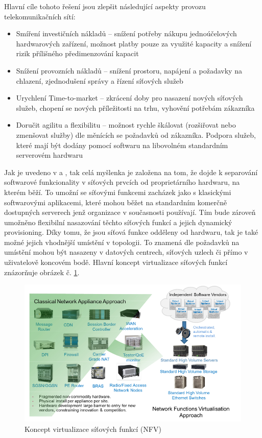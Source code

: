 Hlavní cíle tohoto řešení jsou zlepšit následující aspekty provozu telekomunikačních sítí:

\begin{itemize}
\item Smíření investičních nákladů – snížení potřeby nákupu jednoúčelových hardwarových zařízení, možnost platby pouze za využité kapacity a snížení rizik přílišného předimenzování kapacit
\item Snížení provozních nákladů – snížení prostoru, napájení a požadavky na chlazení, zjednodušení správy a řízení síťových služeb
\item Urychlení Time-to-market – zkrácení doby pro nasazení nových síťových služeb, chopení se nových příležitosti na trhu, vyhovění potřebám zákazníka
\item Doručit agilitu a flexibilitu – možnost rychle škálovat (rozšiřovat nebo zmenšovat služby) dle měnících se požadavků od zákazníka. Podpora služeb, které mají být dodány pomocí softwaru na libovolném standardním serverovém hardwaru
\end{itemize}

Jak je uvedeno v \cite{NFVState} a \cite{NFVChalanges}, tak celá myšlenka je založena na tom, že dojde k separování softwarové funkcionality v síťových prvcích od proprietárního hardwaru, na kterém běží. To umožní se síťovými funkcemi zacházek jako s klasickými softwarovými aplikacemi, které mohou běžet na standardním komerčně dostupných serverech jenž organizace v současnosti používají. Tím bude zároveň umožněno flexibilní nasazování těchto síťových funkcí a jejich dynamický provisioning. Díky tomu, že jsou síťová funkce odděleny od hardwaru, tak je také možné jejich vhodnější umístění v topologii. To znamená dle požadavků na umístění mohou být nasazeny v datových centrech, síťových uzlech či přímo v uživatelově koncovém bodě. Hlavní koncept virtualizace síťových funkcí znázorňuje obrázek č. \ref{fig:vize_NFV}. 

\begin{figure}[h]
\begin{centering}
\includegraphics[scale=0.5]{images/vize_NFV}
\par\end{centering}
\caption{Koncept virtualizace síťových funkcí (NFV)\label{fig:vize_NFV}}
\end{figure}


